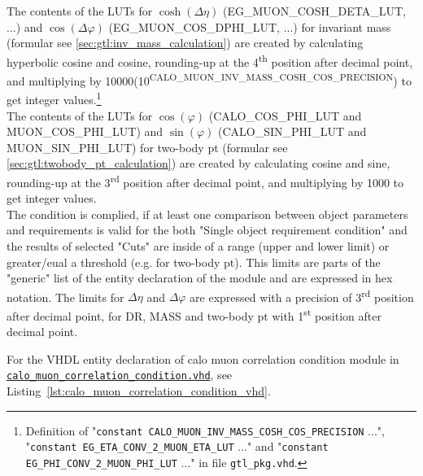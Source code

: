 The contents of the LUTs for $\cosh(\Delta\eta)$ (\small{EG\_MUON\_COSH\_DETA\_LUT}\normalsize, ...) and $\cos(\Delta\varphi)$ (\small{EG\_MUON\_COS\_DPHI\_LUT}\normalsize, ...) for invariant mass (formular see \ref{sec:gtl:inv_mass_calculation}) are created by calculating hyperbolic cosine and cosine, rounding-up at the 4\textsuperscript{th} position after decimal point, and multiplying by 10000(10\textsuperscript{\tiny{CALO\_MUON\_INV\_MASS\_COSH\_COS\_PRECISION}}\normalsize) to get integer values.\footnote{Definition of "\texttt{constant \small{CALO\_MUON\_INV\_MASS\_COSH\_COS\_PRECISION}\normalsize} ...", "\texttt{constant \small{EG\_ETA\_CONV\_2\_MUON\_ETA\_LUT}\normalsize} ..." and "\texttt{constant \small{EG\_PHI\_CONV\_2\_MUON\_PHI\_LUT}\normalsize} ..." in file \texttt{gtl\_pkg.vhd}.}\\
The contents of the LUTs for $\cos(\varphi)$ (\small{CALO\_COS\_PHI\_LUT and MUON\_COS\_PHI\_LUT}\normalsize) and $\sin(\varphi)$ (\small{CALO\_SIN\_PHI\_LUT and MUON\_SIN\_PHI\_LUT}\normalsize) for two-body pt (formular see \ref{sec:gtl:twobody_pt_calculation}) are created by calculating cosine and sine, rounding-up at the 3\textsuperscript{rd} position after decimal point, and multiplying by 1000 to get integer values.\\
The condition is complied, if at least one comparison between object parameters and requirements is valid for the both "Single object requirement condition" and the results of selected "Cuts" are inside of a range (upper and lower limit) or greater/eual a threshold (e.g. for two-body pt). 
This limits are parts of the "generic" list of the entity declaration of the module and are expressed in hex notation. The limits for $\Delta\eta$ and $\Delta\varphi$
are expressed with a precision of 3\textsuperscript{rd} position after decimal point, for DR, MASS and two-body pt with 1\textsuperscript{st} position after decimal point.

For the VHDL entity declaration of calo muon correlation condition module in \href{https://github.com/cms-l1-globaltrigger/mp7_ugt_legacy/tree/master/firmware/hdl/gt_mp7_core/gtl_fdl_wrapper/gtl/calo_muon_correlation_condition.vhd}{\texttt{calo\_muon\_correlation\_condition.vhd}}, see Listing~\ref{lst:calo_muon_correlation_condition_vhd}.\\
\clearpage



